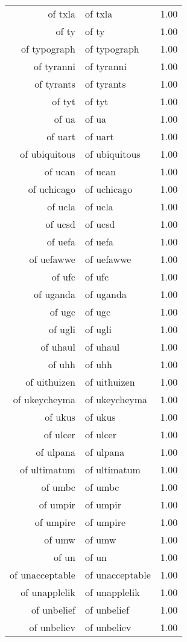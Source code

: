 \begin{table}[ht]
\begin{tabular}{rlr}
  of txla & of txla & 1.00 \\ 
  of ty & of ty & 1.00 \\ 
  of typograph & of typograph & 1.00 \\ 
  of tyranni & of tyranni & 1.00 \\ 
  of tyrants & of tyrants & 1.00 \\ 
  of tyt & of tyt & 1.00 \\ 
  of ua & of ua & 1.00 \\ 
  of uart & of uart & 1.00 \\ 
  of ubiquitous & of ubiquitous & 1.00 \\ 
  of ucan & of ucan & 1.00 \\ 
  of uchicago & of uchicago & 1.00 \\ 
  of ucla & of ucla & 1.00 \\ 
  of ucsd & of ucsd & 1.00 \\ 
  of uefa & of uefa & 1.00 \\ 
  of uefawwe & of uefawwe & 1.00 \\ 
  of ufc & of ufc & 1.00 \\ 
  of uganda & of uganda & 1.00 \\ 
  of ugc & of ugc & 1.00 \\ 
  of ugli & of ugli & 1.00 \\ 
  of uhaul & of uhaul & 1.00 \\ 
  of uhh & of uhh & 1.00 \\ 
  of uithuizen & of uithuizen & 1.00 \\ 
  of ukeycheyma & of ukeycheyma & 1.00 \\ 
  of ukus & of ukus & 1.00 \\ 
  of ulcer & of ulcer & 1.00 \\ 
  of ulpana & of ulpana & 1.00 \\ 
  of ultimatum & of ultimatum & 1.00 \\ 
  of umbc & of umbc & 1.00 \\ 
  of umpir & of umpir & 1.00 \\ 
  of umpire & of umpire & 1.00 \\ 
  of umw & of umw & 1.00 \\ 
  of un & of un & 1.00 \\ 
  of unacceptable & of unacceptable & 1.00 \\ 
  of unapplelik & of unapplelik & 1.00 \\ 
  of unbelief & of unbelief & 1.00 \\ 
  of unbeliev & of unbeliev & 1.00 \\ 

\end{tabular}
\end{table}
